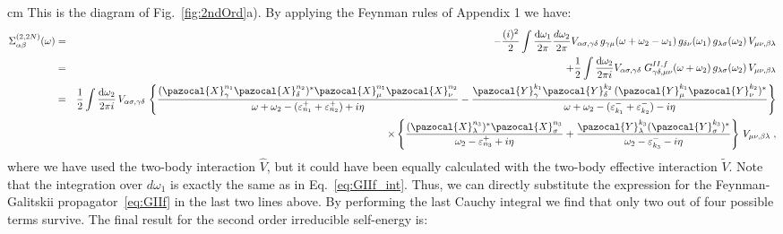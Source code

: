  cm
This is the  diagram of Fig.~\ref{fig:2ndOrd}a). By applying the Feynman rules of Appendix 1 we have:
\begin{eqnarray}
 \Sigma^{(2,2N)}_{\alpha\beta}(\omega) &=&
  - \frac{(i)^2}{2} \int \frac {{\rm d} \omega_1}{2\pi} \frac {d \omega_2}{2\pi}  V_{\alpha\sigma,\gamma\delta} 
         \,  g_{\gamma\mu}(\omega+\omega_2-\omega_1) \, g_{\delta\nu}(\omega_1) \, g_{\lambda\sigma}(\omega_2) 
           \, V_{\mu \nu, \beta \lambda}
\nonumber \\
   &=& + \frac{1}{2} \int \frac {{\rm d} \omega_2}{2\pi i} V_{\alpha\sigma,\gamma\delta} \; 
     G^{II,f}_{\gamma \delta, \mu \nu}(\omega+\omega_2)   \, g_{\lambda\sigma}(\omega_2) 
           \, V_{\mu \nu, \beta \lambda}
\nonumber \\
  &=& \frac{1}{2}   \int \frac {{\rm d} \omega_2}{2\pi i} \, V_{\alpha\sigma,\gamma\delta} \,
  \left\{
    \frac{(\pazocal{X}^{n_1}_\gamma \pazocal{X}^{n_2}_\delta)^*  \pazocal{X}^{n_1}_\mu \pazocal{X}^{n_2}_\nu}
                      {\omega  + \omega_2  - (\varepsilon^+_{n_1}  + \varepsilon^+_{n_2}) + i\eta} 
 -  \frac{ \pazocal{Y}^{k_1}_\gamma \pazocal{Y}^{k_2}_\delta \, (\pazocal{Y}^{k_1}_\mu \pazocal{Y}^{k_2}_\nu)^*}
                     {\omega  + \omega_2  - (\varepsilon^-_{k_1} + \varepsilon^-_{k_2}) - i\eta}
  \right\}
\nonumber \\
&& \qquad \qquad \quad \times  \left\{ \frac{(\pazocal{X}^{n_3}_\lambda )^* \pazocal{X}^{n_3}_\sigma}{\omega_2  - \varepsilon^+_{n_3} + i\eta} 
        + \frac{\pazocal{Y}^{k_3}_\lambda  (\pazocal{Y}^{k_3}_\sigma)^*}{\omega_2  - \varepsilon^-_{k_3} - i\eta}  \right\} 
          \, V_{\mu \nu, \beta \lambda}
 \; ,
\end{eqnarray}
where we have used the two-body interaction $\widehat V$, but it could have been equally calculated with the two-body effective interaction $\widetilde V$. 
Note that the  integration over $d \omega_1$ is exactly the same as in Eq.~\eqref{eq:GIIf_int}. Thus, we can directly substitute the expression for the Feynman-Galitskii propagator~\eqref{eq:GIIf}  in the last two lines above. By performing the last Cauchy integral we find that only two out of four possible terms survive. The final result for the second order irreducible self-energy is: 
